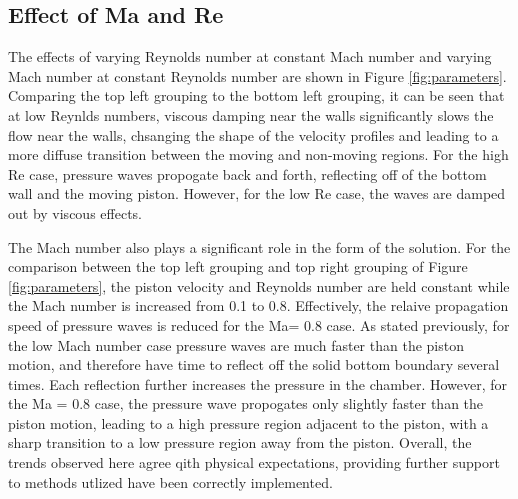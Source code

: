 \documentclass{article}
\begin{document}
\subsection{Effect of Ma and Re}

The effects of varying Reynolds number at constant Mach number and varying Mach number at constant Reynolds number are shown in Figure \ref{fig:parameters}. Comparing the top left grouping to the bottom left grouping, it can be seen that at low Reynlds numbers, viscous damping near the walls significantly slows the flow near the walls, chsanging the shape of the velocity profiles and leading to a more diffuse transition between the moving and non-moving regions. For the high Re case, pressure waves propogate back and forth, reflecting off of the bottom wall and the moving piston. However, for the low Re case, the waves are damped out by viscous effects. 

The Mach number also plays a significant role in the form of the solution. For the comparison between the top left grouping and top right grouping of Figure \ref{fig:parameters}, the piston velocity and Reynolds number are held constant while the Mach number is increased from 0.1 to 0.8. Effectively, the relaive propagation speed of pressure waves is reduced for the Ma= 0.8 case. As stated previously, for the low Mach number case pressure waves are much faster than the piston motion, and therefore have time to reflect off the solid bottom boundary several times. Each reflection further increases the pressure in the chamber. However, for the Ma = 0.8 case, the pressure wave propogates only slightly faster than the piston motion, leading to a high pressure region adjacent to the piston, with a sharp transition to a low pressure region away from the piston. Overall, the trends observed here agree qith physical expectations, providing further support to methods utlized have been correctly implemented.
\end{document}
